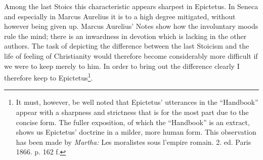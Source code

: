 \documentclass[12pt,a4paper,openany]{book}
\begin{document}
Among the last Stoics this characteristic
appears sharpest in Epictetus. In Seneca and especially in Marcus
Aurelius it is to a high degree mitigated, without however being
given up. Marcus Aurelius' Notes show how the
involuntary moods rule the mind; there is an inwardness
in devotion which is lacking in the other authors. The
task of depicting the difference between the last Stoicism and
the life of feeling of Christianity would therefore become considerably
more difficult if we were to keep merely to him. In order to bring out
the difference clearly I therefore keep to Epictetus\footnote{It must, however, be well noted that Epictetus' utterances in the ``Handbook''
appear with a sharpness and strictness that is for the most part due to
the concise form. The fuller exposition, of which
the ``Handbook'' is an extract, shows us Epictetus' doctrine in a milder,
more human form. This observation has been made by \emph{Martha:} Les
moralistes sous l’empire romain. 2. ed. Paris 1866. p. 162 f.}.
\end{document}
